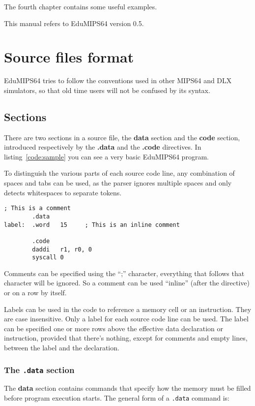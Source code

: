 \documentclass[12pt]{report}
\newcommand{\EM}{EduMIPS64}
\newcommand{\EV}{0.5}
\newcommand{\MS}{MIPS64}
\begin{document}
The fourth chapter contains some useful examples.

This manual refers to EduMIPS64 version \EV.

\chapter{Source files format}
\EM{} tries to follow the conventions used in other \MS{} and DLX simulators, so
that old time users will not be confused by its syntax.

\section{Sections}
There are two sections in a source file, the \textbf{data} section and the
\textbf{code} section, introduced respectively by the \textbf{.data} and the
\textbf{.code} directives. In listing~\ref{code:sample} you can see a very basic
\EM{} program.

To distinguish the various parts of each source code line, any combination of
spaces and tabs can be used, as the parser ignores multiple spaces and only
detects whitespaces to separate tokens.

\begin{lstlisting}[caption={Sample \EM{} code}, label={code:sample}, style={mips}]
; This is a comment
        .data
label:  .word   15     ; This is an inline comment

        .code
        daddi   r1, r0, 0
        syscall 0
\end{lstlisting}

\index{;}
Comments can be specified using the ``;'' character, everything that follows
that character will be ignored. So a comment can be used ``inline'' (after the
directive) or on a row by itself.

 Labels can be used in the code to reference a memory cell or an
instruction.  They are case insensitive. Only a label for each source code line
can be used.  The label can be specified one or more rows above the effective
data declaration or instruction, provided that there's nothing, except for
comments and empty lines, between the label and the declaration. 

\subsection{The \texttt{.data} section}
The \textbf{data} section contains commands that specify how the memory must be
filled before program execution starts. The general form of a \texttt{.data} command
is:
\end{document}

